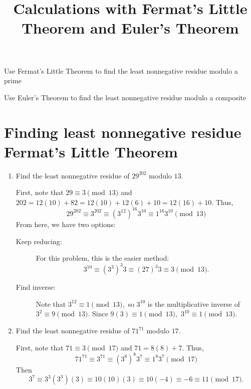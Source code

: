\documentclass{ximera}
\title{Calculations with Fermat's Little Theorem and Euler's Theorem}
\begin{document}
\begin{abstract}
\end{abstract}
\maketitle


\begin{obj}
  \item Use Fermat's Little Theorem to find the least nonnegative residue modulo a prime
  \item Use Euler's Theorem to find the least nonnegative residue modulo a composite
\end{obj}


\section{Finding least nonnegative residue Fermat's Little Theorem}
\begin{example}
  \begin{enumerate}
    \item  Find the least nonnegative residue of $29^{202}$ modulo $13$. 
    
    First, note that $29\equiv 3\pmod{13}$ and $202=12(10)+82=12(10)+12(6)+10=12(16)+10.$  Thus,
    \[29^{202}\equiv3^{202}\equiv (3^{12})^{16}  3^{10}\equiv 1^{16} 3^{10}\pmod{13}\]
    From here,  we have two  options: 
    \begin{description}
      \item[Keep reducing:] For this problem, this is the easier method: 
        \[3^{10}\equiv (3^3)^3 3\equiv (27)^3 3\equiv 3\pmod{13}.\]
      \item[Find inverse:] Note that $3^{12}\equiv 1\pmod{13},$ so $3^{10}$ is the multiplicative inverse of $3^2\equiv 9\pmod{13}.$ Since $9(3)\equiv 1\pmod{13},$ $3^{10}\equiv 1\pmod{13}.$
    \end{description}

    \item Find the least nonnegative residue of $71^{71}$ modulo $17$. 

    First, note that $71\equiv 3\pmod{17}$ and $71=8(8)+7.$  Thus,
    \[71^{71}\equiv3^{71}\equiv (3^{8})^{8}  3^{7}\equiv 1^{8} 3^{7}\pmod{17}\]
    Then \[3^7\equiv 3^{3}(3^3)(3)\equiv 10(10)(3)\equiv 10(-4)\equiv -6\equiv 11\pmod{17}.\]
  \end{enumerate}
\end{example}
\end{document}
